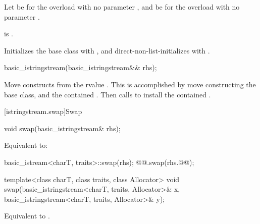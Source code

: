 \begin{itemdescr}
\pnum
Let  be 
for the overload with no parameter , and
 be  for the overload with no parameter .

\pnum
\constraints
{}
is .

\pnum
\effects
Initializes the base class with , and
direct-non-list-initializes  with .
\end{itemdescr}

%
\begin{itemdecl}
basic_istringstream(basic_istringstream&& rhs);
\end{itemdecl}

\begin{itemdescr}
\pnum
\effects
Move constructs from the rvalue . This
is accomplished by move constructing the base class, and the contained
.
Then calls 
to install the contained .
\end{itemdescr}

[istringstream.swap]{Swap}

%
\begin{itemdecl}
void swap(basic_istringstream& rhs);
\end{itemdecl}

\begin{itemdescr}
\pnum
\effects
Equivalent to:
\begin{codeblock}
basic_istream<charT, traits>::swap(rhs);
@@.swap(rhs.@@);
\end{codeblock}
\end{itemdescr}


%
\begin{itemdecl}
template<class charT, class traits, class Allocator>
  void swap(basic_istringstream<charT, traits, Allocator>& x,
            basic_istringstream<charT, traits, Allocator>& y);
\end{itemdecl}

\begin{itemdescr}
\pnum
\effects
Equivalent to .
\end{itemdescr}

